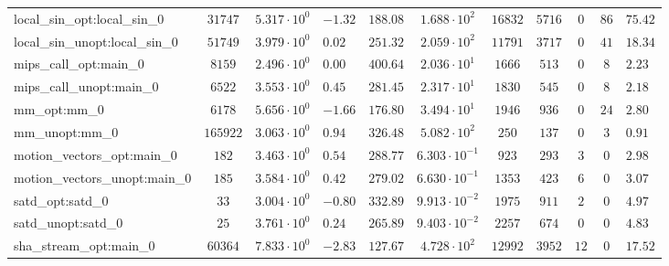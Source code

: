 \begin{tabular}{|l|c|HHc|c|c|c|c|cH|}
local\_sin\_opt:local\_sin\_0                   & $ 31747    $ & $ 5.317 \cdot 10^{0} $ & $ -1.32 $ & $ 188.08 $ & $ 1.688 \cdot 10^{2}  $ & $ 16832  $ & $ 5716  $ & $ 0   $ & $ 86  $ & $ 75.42   $ \\
local\_sin\_unopt:local\_sin\_0                 & $ 51749    $ & $ 3.979 \cdot 10^{0} $ & $ 0.02  $ & $ 251.32 $ & $ 2.059 \cdot 10^{2}  $ & $ 11791  $ & $ 3717  $ & $ 0   $ & $ 41  $ & $ 18.34   $ \\
mips\_call\_opt:main\_0                         & $ 8159     $ & $ 2.496 \cdot 10^{0} $ & $ 0.00  $ & $ 400.64 $ & $ 2.036 \cdot 10^{1}  $ & $ 1666   $ & $ 513   $ & $ 0   $ & $ 8   $ & $ 2.23    $ \\
mips\_call\_unopt:main\_0                       & $ 6522     $ & $ 3.553 \cdot 10^{0} $ & $ 0.45  $ & $ 281.45 $ & $ 2.317 \cdot 10^{1}  $ & $ 1830   $ & $ 545   $ & $ 0   $ & $ 8   $ & $ 2.18    $ \\
mm\_opt:mm\_0                                   & $ 6178     $ & $ 5.656 \cdot 10^{0} $ & $ -1.66 $ & $ 176.80 $ & $ 3.494 \cdot 10^{1}  $ & $ 1946   $ & $ 936   $ & $ 0   $ & $ 24  $ & $ 2.80    $ \\
mm\_unopt:mm\_0                                 & $ 165922   $ & $ 3.063 \cdot 10^{0} $ & $ 0.94  $ & $ 326.48 $ & $ 5.082 \cdot 10^{2}  $ & $ 250    $ & $ 137   $ & $ 0   $ & $ 3   $ & $ 0.91    $ \\
motion\_vectors\_opt:main\_0                    & $ 182      $ & $ 3.463 \cdot 10^{0} $ & $ 0.54  $ & $ 288.77 $ & $ 6.303 \cdot 10^{-1} $ & $ 923    $ & $ 293   $ & $ 3   $ & $ 0   $ & $ 2.98    $ \\
motion\_vectors\_unopt:main\_0                  & $ 185      $ & $ 3.584 \cdot 10^{0} $ & $ 0.42  $ & $ 279.02 $ & $ 6.630 \cdot 10^{-1} $ & $ 1353   $ & $ 423   $ & $ 6   $ & $ 0   $ & $ 3.07    $ \\
satd\_opt:satd\_0                               & $ 33       $ & $ 3.004 \cdot 10^{0} $ & $ -0.80 $ & $ 332.89 $ & $ 9.913 \cdot 10^{-2} $ & $ 1975   $ & $ 911   $ & $ 2   $ & $ 0   $ & $ 4.97    $ \\
satd\_unopt:satd\_0                             & $ 25       $ & $ 3.761 \cdot 10^{0} $ & $ 0.24  $ & $ 265.89 $ & $ 9.403 \cdot 10^{-2} $ & $ 2257   $ & $ 674   $ & $ 0   $ & $ 0   $ & $ 4.83    $ \\
sha\_stream\_opt:main\_0                        & $ 60364    $ & $ 7.833 \cdot 10^{0} $ & $ -2.83 $ & $ 127.67 $ & $ 4.728 \cdot 10^{2}  $ & $ 12992  $ & $ 3952  $ & $ 12  $ & $ 0   $ & $ 17.52   $ \\

\end{tabular}
